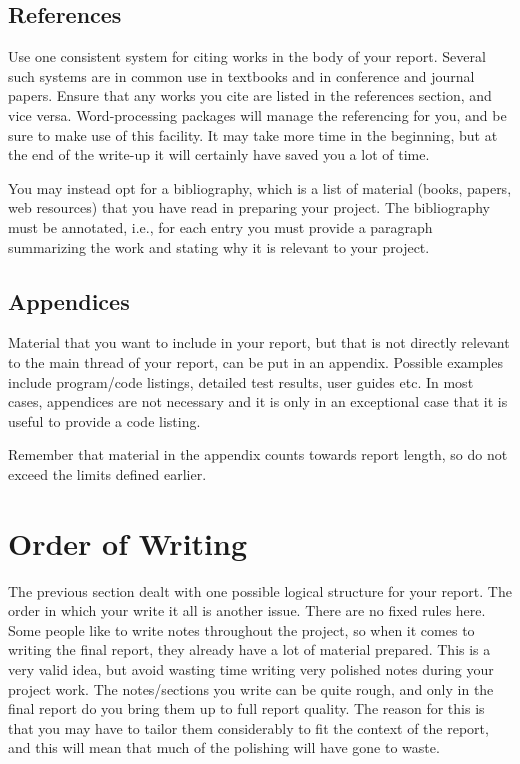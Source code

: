 \documentclass[]{final_report}
\begin{document}
\subsection{References}

Use one consistent system for citing works in the body of your report. Several such systems are in common use in textbooks and in conference and journal papers. Ensure that any works you cite are listed in the references section, and vice versa. Word-processing packages will manage the referencing for you, and be sure to make use of this facility. It may take more time in the beginning, but at the end of the write-up it will certainly have saved you a lot of time.

You may instead opt for a bibliography, which is a list of material (books, papers, web resources) that you have read in preparing your project. The bibliography must be annotated, i.e., for each entry you must provide a paragraph summarizing the work and stating why it is relevant to your project.

\subsection{Appendices}

Material that you want to include in your report, but that is not directly relevant to the main thread of your report, can be put in an appendix. Possible examples include program/code listings, detailed test results, user guides etc. In most cases, appendices are not necessary and it is only in an exceptional case that it is useful to provide a code listing.

Remember that material in the appendix counts towards report length, so do not exceed the limits defined earlier.


\section{Order of Writing}

The previous section dealt with one possible logical structure for your report. The order in which your write it all is another issue. There are no fixed rules here. Some people like to write notes throughout the project, so when it comes to writing the final report, they already have a lot of material prepared. This is a very valid idea, but avoid wasting time writing very polished notes during your project work. The notes/sections you write can be quite rough, and only in the final report do you bring them up to full report quality. The reason for this is that you may have to tailor them considerably to fit the context of the report, and this will mean that much of the polishing will have gone to waste.
\end{document}
